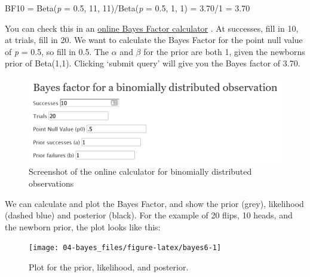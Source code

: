 \documentclass[
  oneside]{book}
\begin{document}
BF10 = Beta(\emph{p} = 0.5, 11, 11)/Beta(\emph{p} = 0.5, 1, 1) = 3.70/1 = 3.70

You can check this in an \href{http://pcl.missouri.edu/bf-binomial}{online Bayes Factor calculator} \citep{rouder_bayesian_2009}. At successes, fill in 10, at trials, fill in 20. We want to calculate the Bayes Factor for the point null value of \emph{p} = 0.5, so fill in 0.5. The \(\alpha\) and \(\beta\) for the prior are both 1, given the newborns prior of Beta(1,1). Clicking `submit query' will give you the Bayes factor of 3.70.



\begin{figure}

{\centering \includegraphics[width=1\linewidth]{images/binombayesonline} 

}

\caption{Screenshot of the online calculator for binomially distributed observations}\label{fig:gpower-screenshot-bayes}
\end{figure}

We can calculate and plot the Bayes Factor, and show the prior (grey), likelihood (dashed blue) and posterior (black). For the example of 20 flips, 10 heads, and the newborn prior, the plot looks like this:



\begin{figure}

{\centering \texttt{[image: 04-bayes\_files/figure-latex/bayes6-1]} 

}

\caption{Plot for the prior, likelihood, and posterior.}\label{fig:bayes6}
\end{figure}
\end{document}
